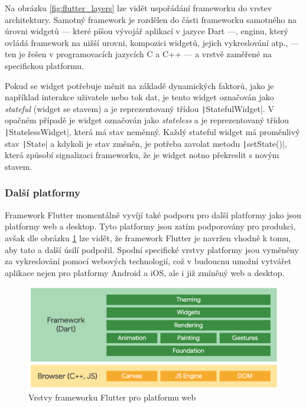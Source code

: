 Na obrázku \ref{fig:flutter_layers} lze vidět uspořádání frameworku do vrstev
architektury.
Samotný framework je rozdělen do části frameworku samotného na úrovni widgetů
--- které píšou vývojář aplikací v jazyce Dart ---,
enginu, který ovládá framework na nižší urovni,
kompozici widgetů, jejich vykreslování atp.,
--- ten je řešen v programovacích jazycích C a C++ ---
a vrstvě zaměřené na specifickou platformu.
\cite{flutter_technical_overview}

Pokud se widget potřebuje měnit na základě dynamických faktorů,
jako je například interakce uživatele nebo tok dat,
je tento widget označován jako \emph{stateful} (widget se stavem) a je
reprezentovaný třídou \texttt|StatefulWidget|.
V opačném případě je widget označován jako \emph{stateless} a je 
reprezentovaný třídou \texttt|StatelessWidget|,
která má stav neměnný.
Každý stateful widget má proměnlivý stav \texttt|State|
a kdykoli je stav změněn,
je potřeba zavolat metodu \texttt|setState()|,
která způsobí signalizaci frameworku,
že je widget notno překreslit s novým stavem.
\cite{flutter_technical_overview}

\subsubsection*{Další platformy}

Framework Flutter momentálně vyvíjí \cite{flutter_web} také podporu pro
další platformy jako jsou platformy web a desktop.
Tyto platformy jsou zatím podporovány pro produkci,
avšak dle obrázku \ref{fig:flutter_layers_web} lze vidět,
že framework Flutter je navržen vhodně k tomu,
aby tato a další úsilí podpořil.
Spodní specifické vrstvy platformy jsou vyměněny za vykreslování pomocí
webových technologií,
což v budoucnu umožní vytvářet aplikace nejen pro platformy Android a iOS,
ale i již zmíněný web a desktop. 

\begin{figure}[ht!]
    \centering
    \includegraphics[width=\linewidth]{assets/technology-research/framework/flutter_overview_web.png}
    \caption{Vrstvy frameworku Flutter pro platformu web  \cite{flutter_web}}
    \label{fig:flutter_layers_web}
\end{figure}

